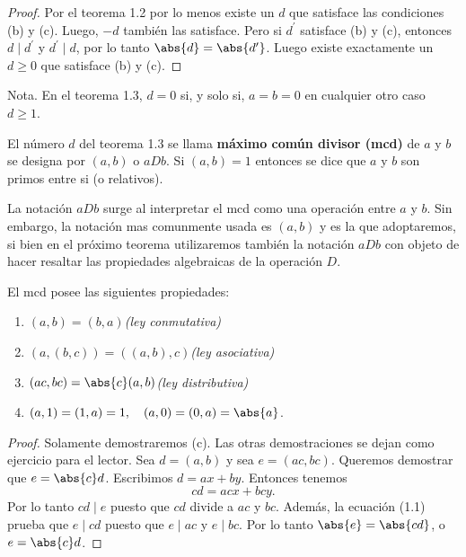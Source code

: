 \documentclass[12pt,a4paper]{book}
\begin{document}
    \begin{proof}
        Por el teorema 1.2 por lo menos existe un $d$ que satisface las condiciones (b) y (c).
        Luego, $-d$ también las satisface. Pero si $d^{\prime}$ satisface (b) y (c), entonces
        $d\mid d^{\prime}$ y $d^{\prime}\mid d$, por lo tanto $\abs{d}=\abs{d^{\prime}}$. Luego
        existe exactamente un $d\geq0$ que satisface (b) y (c).
    \end{proof}
    
    Nota. En el teorema 1.3, $d=0$ si, y solo si, $a=b=0$ en cualquier otro caso $d\geq1.$

    \begin{definicion}
        El número $d$ del teorema 1.3 se llama \textbf{máximo común divisor (mcd)} de $a$ y
        $b$ se designa por $(a,b)$ o $aDb$. Si $(a,b)=1$ entonces se dice que $a$ y $b$ son
        primos entre si (o relativos).
    \end{definicion}

    La notación $aDb$ surge al interpretar el mcd como una operación entre $a$ y $b$. Sin
    embargo, la notación mas comunmente usada es $(a,b)$ y es la que adoptaremos, si bien
    en el próximo teorema utilizaremos también la notación $aDb$ con objeto de hacer resaltar
    las propiedades algebraicas de la operación $D$.
    
    \begin{teorema}
        El mcd posee las siguientes propiedades:
        \begin{enumerate}
            \item[(a)] $(a,b)=(b,a)$\hfill\textit{(ley conmutativa)}
            \item[(b)] $(a,(b,c))=((a,b),c)$\hfill\textit{(ley asociativa)}
            \item[(c)] $(ac,bc)=\abs{c}(a,b)$\hfill\textit{(ley distributiva)}
            \item[(d)] $(a,1)=(1,a)=1,\quad (a,0)=(0,a)=\abs{a}$.   
        \end{enumerate}
    \end{teorema}

    \begin{proof}
        Solamente demostraremos (c). Las otras demostraciones se dejan como ejercicio para el
        lector. Sea $d=(a,b)$ y sea $e=(ac,bc)$. Queremos demostrar que $e=\abs{c}d$. Escribimos
        $d=ax+by$. Entonces tenemos
        \begin{equation}
            cd=acx+bcy.
        \end{equation}
        Por lo tanto $cd\mid e$ puesto que $cd$ divide a $ac$ y $bc$. Además, la ecuación (1.1)
        prueba que $e\mid cd$ puesto que $e\mid ac$ y $e\mid bc$. Por lo tanto $\abs{e}=\abs{cd}$,
        o $e=\abs{c}d$.
    \end{proof}
\end{document}
